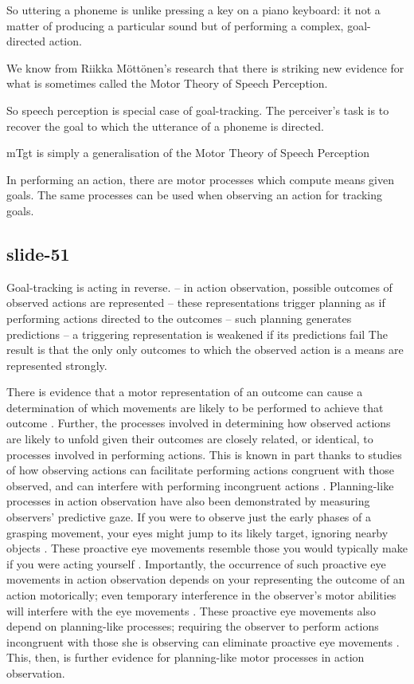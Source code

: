 \documentclass[12pt,\papersize]{extarticle}
\begin{document}
So uttering a phoneme is unlike pressing a key on a piano keyboard:
it not a matter of producing a particular sound
but of performing a complex, goal-directed action.
 
We know from Riikka Möttönen’s research that there is striking new
evidence for what is sometimes called the Motor Theory of Speech Perception.
 
So speech perception is special case of goal-tracking.
The perceiver’s task is to recover the goal to which the utterance of a phoneme is directed.
 
mTgt is simply a generalisation of the Motor Theory of Speech Perception
 
In performing an action, there are motor processes which compute means given goals.
The same processes can be used when observing an action for tracking goals.
 
\subsection{slide-51}
Goal-tracking is acting in reverse.
-- in action observation, possible outcomes of observed actions are represented
-- these representations trigger planning as if performing actions directed to the outcomes
-- such planning generates predictions
-- a triggering representation is weakened if its predictions fail
The result is that the only only outcomes to which the observed action is a means
are represented strongly.
 
There is evidence that a motor representation of an outcome can cause a determination of which
movements are likely to be performed to achieve that outcome \citep[see, for
instance,][]{kilner:2004_motor, urgesi:2010_simulating}. Further, the processes involved in
determining how observed actions are likely to unfold given their outcomes are closely related,
or identical, to processes involved in performing actions.
This is known in part thanks to studies of how observing actions can facilitate performing
actions congruent with those observed, and can interfere with performing incongruent actions
\citep{
	brass:2000_compatibility, 
	craighero:2002_hand, 
	kilner:2003_interference, 
	costantini:2012_does}. 
Planning-like processes in action observation have also been demonstrated by measuring observers' predictive gaze.  If you were to observe just the early phases of a grasping movement, your eyes might jump to its likely target, ignoring nearby objects \citep{ambrosini:2011_grasping}. These proactive eye movements resemble those you would typically make if you were acting yourself \citep{Flanagan:2003lm}. 
Importantly, the occurrence of such proactive eye movements in action observation depends on your
representing the outcome of an action motorically; even temporary interference in the observer's
motor abilities will interfere with the eye movements \citep{Costantini:2012fk}.
These proactive eye movements also depend on planning-like processes; requiring the observer to
perform actions incongruent with those she is observing can eliminate proactive eye movements
\citep{Costantini:2012uq}. This, then, is further evidence for planning-like motor processes in
action observation.
 
\end{document}
